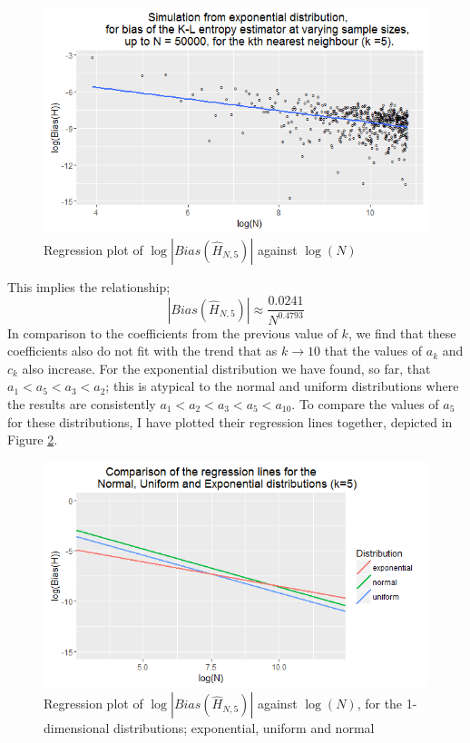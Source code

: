 \documentclass{article}
\begin{document}
\begin{figure}
  \begin{center}
    \includegraphics[width=\textwidth]{./Graphs/Expo_k=5_plot.png}
  \end{center}
\caption{Regression plot of $\log|Bias(\hat{H}_{N, 5})|$ against $\log(N)$}
  \label{expo_k=5_graph}
\end{figure}

This implies the relationship;
\begin{equation}
|Bias(\hat{H}_{N, 5})| \approx \frac{0.0241}{N^{0.4793}}\nonumber
\end{equation}
In comparison to the coefficients from the previous value of $k$, we find that these coefficients also do not fit with the trend that as $k \to 10$ that the values of $a_{k}$ and $c_{k}$ also increase. For the exponential distribution we have found, so far, that $a_{1} < a_{5} < a_{3} < a_{2}$; this is atypical to the normal and uniform distributions where the results are consistently $a_{1} < a_{2} < a_{3} < a_{5} < a_{10}$. To compare the values of $a_{5}$ for these distributions, I have plotted their regression lines together, depicted in Figure \ref{E_U_N_k=5_graph}.

\begin{figure}
  \begin{center}
    \includegraphics[width=\textwidth]{./Graphs/EUN_k=5_plot.png}
  \end{center}
\caption{Regression plot of $\log|Bias(\hat{H}_{N,5})|$ against $\log(N)$, for the 1-dimensional distributions; exponential, uniform and normal}
  \label{E_U_N_k=5_graph}
\end{figure}
\end{document}
